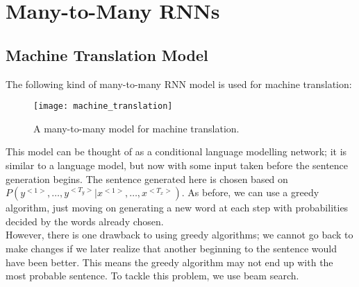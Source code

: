 \documentclass[a4paper, 12pt]{report}
\begin{document}
\chapter{Many-to-Many RNNs}

\section{Machine Translation Model}
The following kind of many-to-many RNN model is used for machine translation:
\begin{figure}[H]
\centering
\texttt{[image: machine\_translation]}
\caption{A many-to-many model for machine translation.}
\end{figure}
This model can be thought of as a conditional language modelling network; it is similar to a language model, but now with some input taken before the sentence generation begins. The sentence generated here is chosen based on $P(y^{<1>},\dots,y^{<T_y>}|x^{<1>},\dots,x^{<T_x>})$. As before, we can use a greedy algorithm, just moving on generating a new word at each step with probabilities decided by the words already chosen.\\
\break
However, there is one drawback to using greedy algorithms; we cannot go back to make changes if we later realize that another beginning to the sentence would have been better. This means the greedy algorithm may not end up with the most probable sentence. To tackle this problem, we use beam search.
\end{document}
